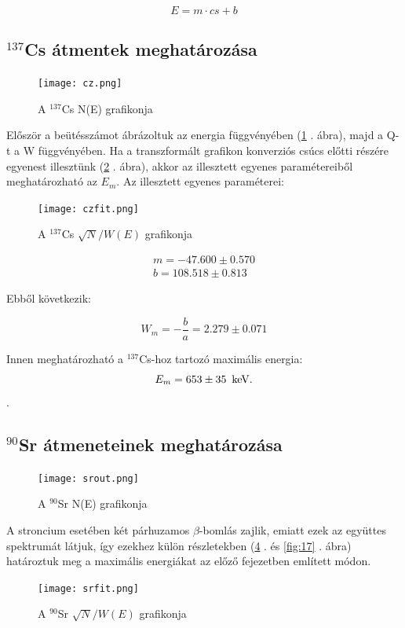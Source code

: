 \documentclass[12pt,a4paper]{article}
\begin{document}
\begin{equation*}
E=m\cdot cs+b
\end{equation*}
\newpage

\subsection{$^{137}$Cs átmentek meghatározása}

\begin{figure}[!h]
\centering
\texttt{[image: cz.png]}
\caption{A $^{137}$Cs N(E) grafikonja}
\label{fig:13}
\end{figure}

Először a beütésszámot ábrázoltuk az energia függvényében (\ref{fig:13} . ábra), majd a Q-t a W függvényében. Ha a transzformált grafikon konverziós csúcs előtti részére egyenest illesztünk (\ref{fig:14} . ábra), akkor az illesztett egyenes paramétereiből meghatározható az $E_m$. 
Az illesztett egyenes paraméterei:

\begin{figure}[!h]
\centering
\texttt{[image: czfit.png]}
\caption{A $^{137}$Cs $\sqrt{N}/W(E)$ grafikonja}
\label{fig:14}
\end{figure}
\newpage

\begin{equation*}
\begin{split}
m = -47.600 \pm 0.570\\
b = 108.518 \pm 0.813
\end{split}
\end{equation*}

Ebből következik: 

\begin{equation*}
W_m = - \dfrac{b}{a} = 2.279 \pm 0.071
\end{equation*}

Innen meghatározható a $^{137}$Cs-hoz tartozó maximális energia: $$E_{m} = 653 \pm 35\hspace*{5pt}  \mathrm{keV}.$$.

\subsection{$^{90}$Sr átmeneteinek meghatározása}

\begin{figure}[!h]
\centering
\texttt{[image: srout.png]}
\caption{A $^{90}$Sr N(E) grafikonja}
\label{fig:15}
\end{figure}

A stroncium esetében két párhuzamos $\beta$-bomlás zajlik, emiatt ezek az együttes spektrumát látjuk, így ezekhez külön részletekben (\ref{fig:16} . és \ref{fig:17} . ábra) határoztuk meg a maximális energiákat az előző fejezetben említett módon. 
\newpage
\begin{figure}[!h]
\centering
\texttt{[image: srfit.png]}
\caption{A $^{90}$Sr $\sqrt{N}/W(E)$ grafikonja}
\label{fig:16}
\end{figure}
\end{document}
